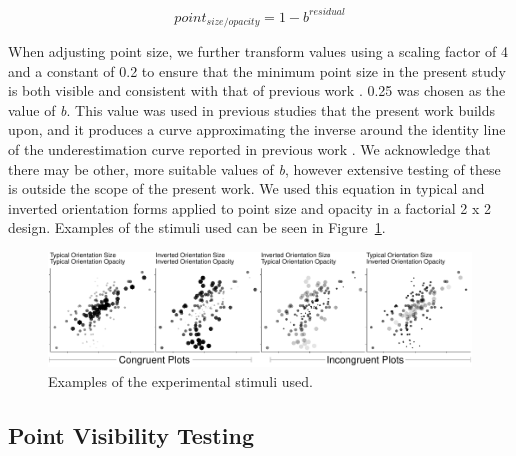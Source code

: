 \documentclass[manuscript, review, anonymous, screen]{acmart}
\begin{document}
\begin{equation}
  point_{size/opacity} = 1 - b^{residual}
\end{equation}

When adjusting point size, we further transform values using a scaling
factor of 4 and a constant of 0.2 to ensure that the minimum point size
in the present study is both visible and consistent with that of
previous work \citep{strain_2023, strain_2023b}. 0.25 was chosen as the
value of \emph{b}. This value was used in previous studies that the
present work builds upon, and it produces a curve approximating the
inverse around the identity line of the underestimation curve reported
in previous work \citep{rensink_2017, strain_2023, strain_2023b}. We
acknowledge that there may be other, more suitable values of \emph{b},
however extensive testing of these is outside the scope of the present
work. We used this equation in typical and inverted orientation forms
applied to point size and opacity in a factorial 2 x 2 design. Examples
of the stimuli used can be seen in Figure~\ref{fig-examples}.

\begin{figure}

\includegraphics[width=1\textwidth,height=\textheight]{size_and_opacity_files/figure-pdf/fig-examples-1.pdf} \hfill{}

\caption{\label{fig-examples}Examples of the experimental stimuli used.}

\end{figure}

\hypertarget{sec-VT}{%
\subsection{Point Visibility Testing}\label{sec-VT}}
\end{document}
